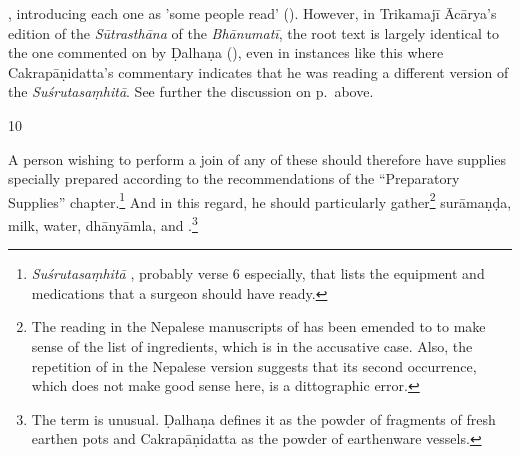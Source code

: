\begin{translation}
{            \citep[128–129]{acar-1939}, introducing each one as 'some people read' (). However,  in Trikamajī Ācārya's edition of the \emph{Sūtrasthāna}
            of the \emph{Bhānumatī}, the root text is largely identical to the one commented
            on by Ḍalhaṇa (\cite{vulgate}), even in instances like this where Cakrapāṇidatta's
            commentary indicates that he was reading a different version of the
            \emph{Suśrutasaṃhitā}. See further the discussion on p.\,\pageref{skinflap}
            above.} 
            \item[10]
    
A person wishing to perform a join of any of these should therefore have
supplies specially prepared according to the recommendations of the
“Preparatory Supplies” chapter.\footnote{\emph{Suśrutasaṃhitā}
    , probably verse 6 especially, that lists the equipment and
    medications that a surgeon should have ready.}  And in this regard, he should
    particularly gather\footnote{The reading in the Nepalese manuscripts of
         has been emended to
         to make sense of the list of ingredients, which is
        in the accusative case. Also, the repetition of  in the
        Nepalese version suggests that its second occurrence, which does not make good
        sense here, is a dittographic error.} \gls{surāmaṇḍa}, milk,
        water, \gls{dhānyāmla}, and
        .\footnote{The term
             is unusual. Ḍalhaṇa \citep[79]{vulgate} defines it as the
            powder of fragments of fresh earthen pots and Cakrapāṇidatta
            \citep[129]{acar-1939} as the powder of earthenware vessels.}
    

\end{translation}
